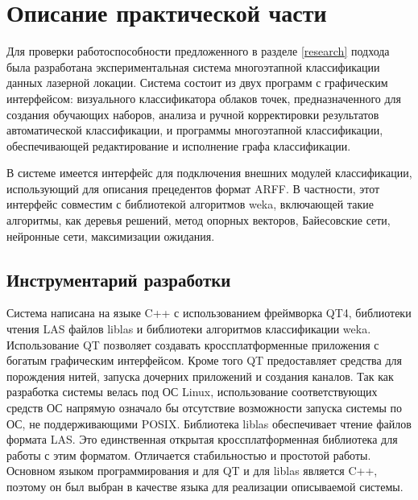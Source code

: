 \newpage
\section{Описание практической части}


Для проверки работоспособности предложенного в разделе \ref{research} подхода была разработана экспериментальная система многоэтапной классификации данных лазерной локации. Система состоит из двух программ с графическим интерфейсом: визуального классификатора облаков точек, предназначенного для создания обучающих наборов, анализа и ручной корректировки результатов автоматической классификации, и программы многоэтапной классификации, обеспечивающей редактирование и исполнение графа классификации.

В системе имеется интерфейс для подключения внешних модулей классификации, использующий для описания прецедентов формат ARFF. В частности, этот интерфейс совместим с библиотекой алгоритмов weka, включающей такие алгоритмы, как деревья решений, метод опорных векторов, Байесовские сети, нейронные сети, максимизации ожидания. 

\subsection{Инструментарий разработки}

Система написана на языке C++ с использованием фреймворка QT4, библиотеки чтения LAS файлов liblas и библиотеки алгоритмов классификации weka. Использование QT позволяет создавать кроссплатформенные приложения с богатым графическим интерфейсом. Кроме того QT предоставляет средства для порождения нитей, запуска дочерних приложений и создания каналов. Так как разработка системы велась под ОС Linux, использование соответствующих средств ОС напрямую означало бы отсутствие возможности запуска системы по ОС, не поддерживающими POSIX. Библиотека liblas обеспечивает чтение файлов формата LAS. Это единственная открытая кроссплатформенная библиотека для работы с этим форматом. Отличается стабильностью и простотой работы. Основном языком программирования и для QT и для liblas является C++, поэтому он был выбран в качестве языка для реализации описываемой системы. 

